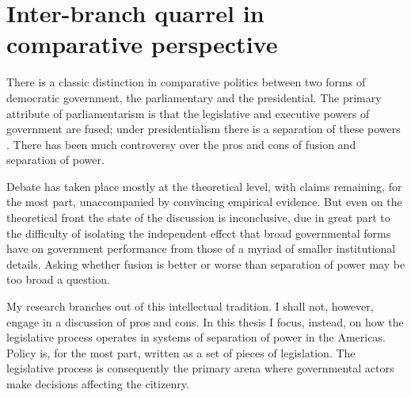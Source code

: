 \chapter{Inter-branch quarrel in comparative perspective}
\label{ch:sopInPerspective}


There is a classic distinction in comparative politics between two forms of democratic government, the parliamentary and the presidential.  The primary attribute of parliamentarism is that the legislative and executive powers of government are fused; under presidentialism there is a separation of these powers \citep{lijphart.1984}. There has been much controversy over the pros and cons of fusion and separation of power.  

Debate has taken place mostly at the theoretical level, with claims remaining, for the most part, unaccompanied by convincing empirical evidence.  But even on the theoretical front the state of the discussion is inconclusive, due in great part to the difficulty of isolating the independent effect that broad governmental forms have on government performance from those of a myriad of smaller institutional details.  Asking whether fusion is better or worse than separation of power may be too broad a question.  

My research branches out of this intellectual tradition.  I shall not, however, engage in a discussion of pros and cons.  In this thesis I focus, instead, on how the legislative process operates in systems of separation of power in the Americas.  Policy is, for the most part, written as a set of pieces of legislation.  The legislative process is consequently the primary arena where governmental actors make decisions affecting the citizenry.  


